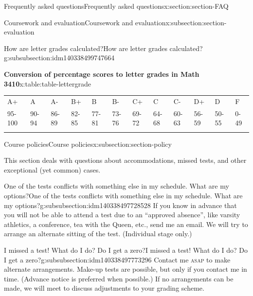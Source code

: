 \documentclass[oneside,10pt,]{article}
\newcommand{\initialism}[1]{\textsc{\MakeLowercase{#1}}}
\newcommand{\hrulethin}  {\noalign{\hrule height 0.04em}}
\begin{document}
\begin{sectionptx}{Frequently asked questions}{}{Frequently asked questions}{}{}{x:section:section-FAQ}
\begin{subsectionptx}{Coursework and evaluation}{}{Coursework and evaluation}{}{}{x:subsection:section-evaluation}
\begin{subsubsectionptx}{How are letter grades calculated?}{}{How are letter grades calculated?}{}{}{g:subsubsection:idm140338499747664}
\begin{tableptx}{\textbf{Conversion of percentage scores to letter grades in Math 3410}}{x:table:table-lettergrade}{}%
\centering
\noindent\hspace{-40pt}\begin{tabular}{llllllllllll}\hrulethin
A+&A&A-&B+&B&B-&C+&C&C-&D+&D&F\tabularnewline\hrulethin
95-100&90-94&86-89&82-85&77-81&73-76&69-72&64-68&60-63&56-59&50-55&0-49\tabularnewline\hrulethin
\end{tabular}
\end{tableptx}%
\end{subsubsectionptx}
\end{subsectionptx}
%
%
\typeout{************************************************}
\typeout{************************************************}
%
\begin{subsectionptx}{Course policies}{}{Course policies}{}{}{x:subsection:section-policy}
\begin{introduction}{}%
This section deals with questions about accommodations, missed tests, and other exceptional (yet common) cases.%
\end{introduction}%
%
%
\typeout{************************************************}
\typeout{************************************************}
%
\begin{subsubsectionptx}{One of the tests conflicts with something else in my schedule. What are my options?}{}{One of the tests conflicts with something else in my schedule. What are my options?}{}{}{g:subsubsection:idm140338497728528}
If you know in advance that you will not be able to attend a test due to an ``approved absence'', like varsity athletics, a conference, tea with the Queen, etc.\@, send me an email. We will try to arrange an alternate sitting of the test. (Individual stage only.)%
\end{subsubsectionptx}
%
%
\typeout{************************************************}
\typeout{************************************************}
%
\begin{subsubsectionptx}{I missed a test! What do I do? Do I get a zero?}{}{I missed a test! What do I do? Do I get a zero?}{}{}{g:subsubsection:idm140338497773296}
Contact me \initialism{ASAP} to make alternate arrangements. Make-up tests are possible, but only if you contact me in time. (Advance notice is preferred when possible.) If no arrangements can be made, we will meet to discuss adjustments to your grading scheme.%

\end{subsubsectionptx}
\end{subsectionptx}
\end{sectionptx}
\end{document}
